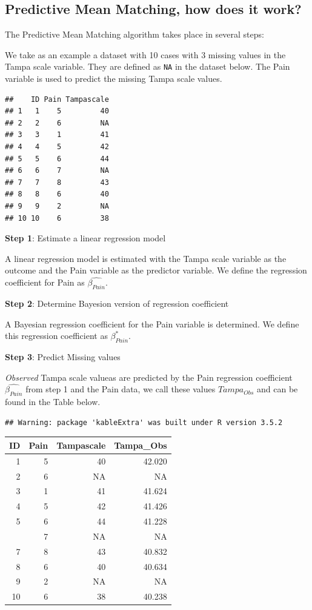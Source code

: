 \documentclass[]{book}
\begin{document}
\subsection{Predictive Mean Matching, how does it
work?}\label{predictive-mean-matching-how-does-it-work}

The Predictive Mean Matching algorithm takes place in several steps:

We take as an example a dataset with 10 cases with 3 missing values in
the Tampa scale variable. They are defined as \texttt{NA} in the dataset
below. The Pain variable is used to predict the missing Tampa scale
values.

\begin{verbatim}
##    ID Pain Tampascale
## 1   1    5         40
## 2   2    6         NA
## 3   3    1         41
## 4   4    5         42
## 5   5    6         44
## 6   6    7         NA
## 7   7    8         43
## 8   8    6         40
## 9   9    2         NA
## 10 10    6         38
\end{verbatim}

\textbf{Step 1}: Estimate a linear regression model

A linear regression model is estimated with the Tampa scale variable as
the outcome and the Pain variable as the predictor variable. We define
the regression coefficient for Pain as \(\hat{\beta_{Pain}}\).

\textbf{Step 2}: Determine Bayesion version of regression coefficient

A Bayesian regression coefficient for the Pain variable is determined.
We define this regression coefficient as \(\beta_{Pain}^*\).

\textbf{Step 3}: Predict Missing values

\emph{Observed} Tampa scale valueas are predicted by the Pain regression
coefficient \(\hat{\beta_{Pain}}\) from step 1 and the Pain data, we
call these values \(Tampa_{Obs}\) and can be found in the Table below.

\begin{verbatim}
## Warning: package 'kableExtra' was built under R version 3.5.2
\end{verbatim}

\begin{tabular}{rrrr}
\toprule
ID & Pain & Tampascale & Tampa\_Obs\\
\midrule
1 & 5 & 40 & 42.020\\
2 & 6 & NA & NA\\
3 & 1 & 41 & 41.624\\
4 & 5 & 42 & 41.426\\
5 & 6 & 44 & 41.228\\
\addlinespace
6 & 7 & NA & NA\\
7 & 8 & 43 & 40.832\\
8 & 6 & 40 & 40.634\\
9 & 2 & NA & NA\\
10 & 6 & 38 & 40.238\\
\bottomrule
\end{tabular}
\end{document}
